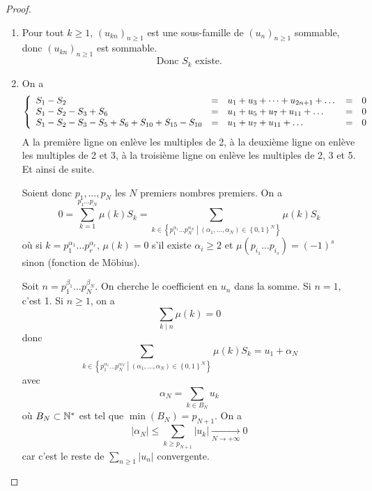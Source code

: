 \begin{proof}
	\phantom{}
	\begin{enumerate}
		\item Pour tout $k\geqslant1$, $\left(u_{kn}\right)_{n\geqslant1}$ est une sous-famille de $\left(u_{n}\right)_{n\geqslant1}$ sommable, donc $\left(u_{kn}\right)_{n\geqslant1}$ est sommable.
		\begin{equation}\boxed{\text{Donc }S_{k}\text{ existe.}}\end{equation}

		\item On a 
		\begin{equation}
		\left\{
			\begin{array}[]{lllll}
				S_{1}-S_{2} &= &u_{1}+u_{3}+\dots+u_{2n+1}+\dots &= &0\\
				S_{1}-S_{2}-S_{3}+S_{6} &= &u_{1}+u_{5}+u_{7}+u_{11}+\dots &= &0\\
				S_{1}-S_{2}-S_{3}-S_{5}+S_{6}+S_{10}+S_{15}-S_{10} &= &u_{1}+u_{7}+u_{11}+\dots &= &0
			\end{array}
		\right.
		\end{equation}
		A la première ligne on enlève les multiples de 2, à la deuxième ligne on enlève les multiples de 2 et 3, à la troisième ligne on enlève les multiples de 2, 3 et 5. Et ainsi de suite.

		Soient donc $p_{1},\dots,p_{N}$ les $N$ premiers nombres premiers. On a 
		\begin{equation}0=\sum_{k=1}^{p_{1}\dots p_{N}}\mu(k)S_{k}=\sum_{k\in\left\{p_{1}^{\alpha_{1}}\dots p_{N}^{\alpha_{N}}\middle|\left(\alpha_{1},\dots,\alpha_{N}\right)\in\left\{0,1\right\}^{N}\right\}}\mu(k)S_{k}\end{equation}
		où si $k=p_{1}^{\alpha_{1}}\dots p_{r}^{\alpha_{r}}$, $\mu(k)=0$ s'il existe $\alpha_{i}\geqslant 2$ et $\mu\left(p_{i_{1}}\dots p_{i_{s}}\right)=\left(-1\right)^{s}$ sinon (fonction de Möbius).

		Soit $n=p_{1}^{\beta_{1}}\dots p_{N}^{\beta_{N}}$. On cherche le coefficient en $u_{n}$ dans la somme. Si $n=1$, c'est 1. Si $n\geqslant 1$, on a 
		\begin{equation}\sum_{k\mid n}\mu(k)=0\end{equation}
		donc 
		\begin{equation}\sum_{k\in\left\{p_{1}^{\alpha_{1}}\dots p_{N}^{\alpha_{N}}\middle|\left(\alpha_{1},\dots,\alpha_{N}\right)\in\left\{0,1\right\}^{N}\right\}}\mu(k)S_{k}=u_{1}+\alpha_{N}\end{equation}
		avec 
		\begin{equation}\alpha_{N}=\sum_{k\in B_{N}}u_{k}\end{equation}
		où $B_{N}\subset\mathbb{N}^{*}$ est tel que $\min\left(B_{N}\right)=p_{N+1}$. On a 
		\begin{equation}\left\lvert \alpha_{N}\right\rvert\leqslant\sum_{k\geqslant p_{N+1}}\left\lvert u_{k}\right\rvert\xrightarrow[N\to+\infty]{}0\end{equation}
		car c'est le reste de $\sum_{n\geqslant 1}\left\lvert u_n\right\rvert$ convergente.


\end{enumerate}
\end{proof}
